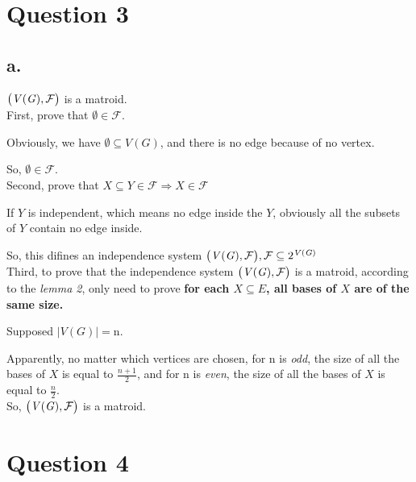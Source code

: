 \documentclass{article}
\begin{document}
\section*{Question 3}{
    \subsection*{a.}{
        \(\big{(}\mathit{V(G)},\mathcal{F}\big{)}\) is a matroid.\\

        First, prove that \(\emptyset \in \mathcal{F}\).

        Obviously, we have \(\emptyset \subseteq \mathit{V(G)}\), and there is no edge because of no vertex. 

        So, \(\emptyset \in \mathcal{F}\).\\

        Second, prove that \(\mathit{X} \subseteq \mathit{Y} \in \mathcal{F} \Rightarrow \mathit{X} \in \mathcal{F}\)

        If \(\mathit{Y}\) is independent, which means no edge inside the \(\mathit{Y}\), obviously all the subsets of \(\mathit{Y}\) contain no edge inside.

        So, this difines an independence system \(\big{(}\mathit{V(G)},\mathcal{F}\big{)}, \mathcal{F} \subseteq \mathrm{2}^{\mathit{V(G)}}\)\\

        Third, to prove that the independence system \(\big{(}\mathit{V(G)},\mathcal{F}\big{)}\) is a matroid, according to the \textit{lemma 2}, only need to prove \textbf{for each \(\mathit{X} \subseteq \mathit{E}\), all bases of \(\mathit{X}\) are of the same size.}

        Supposed \(\lvert \mathit{V(G)} \rvert = \mathrm{n}\). 

        Apparently, no matter which vertices are chosen, for \(\mathrm{n}\) is \textit{odd}, the size of all the bases of \(\mathit{X}\) is equal to \(\frac{\mathit{n}+\mathrm{1}}{\mathrm{2}}\), and for \(\mathrm{n}\) is \textit{even}, the size of all the bases of \(\mathit{X}\) is equal to \(\frac{\mathit{n}}{\mathrm{2}}\).\\

        So, \(\big{(}\mathit{V(G)},\mathcal{F}\big{)}\) is a matroid.
    }
}

\section*{Question 4}{

}
\end{document}
